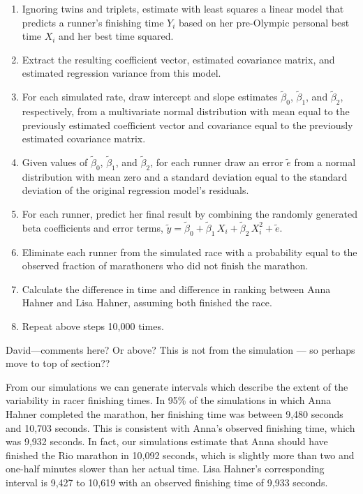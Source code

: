 \documentclass[12pt,titlepage]{article}
\begin{document}
\begin{enumerate}
\item Ignoring twins and triplets, estimate with least squares a
  linear model that predicts a runner's finishing time $Y_i$ based on
  her pre-Olympic personal best time $X_i$ and her best time squared.
\item Extract the resulting coefficient vector, estimated covariance
  matrix, and estimated regression variance from this model.
\item For each simulated rate, draw intercept and slope estimates
  $\tilde{\beta}_0$, $\tilde{\beta}_1$, and $\tilde{\beta}_2$,
  respectively, from a multivariate normal distribution with mean
  equal to the previously estimated coefficient vector and covariance
  equal to the previously estimated covariance matrix.
\item Given values of $\tilde{\beta}_0$, $\tilde{\beta}_1$, and
  $\tilde{\beta}_2$, for each runner draw an error $\tilde{e}$ from a
  normal distribution with mean zero and a standard deviation equal to
  the standard deviation of the original regression model's residuals.
\item For each runner, predict her final result by combining the
  randomly generated beta coefficients and error terms,
  $\tilde{y} = \tilde{\beta}_0 + \tilde{\beta}_1\,X_i +
  \tilde{\beta}_2\,X_i^2 + \tilde{e}$.
\item Eliminate each runner from the simulated race with a probability
  equal to the observed fraction of marathoners who did not finish the
  marathon.
\item Calculate the difference in time and difference in ranking
  between Anna Hahner and Lisa Hahner, assuming both finished the
  race.
\item Repeat above steps 10,000 times.
\end{enumerate}

David---comments here?    Or above?  This is not from the simulation
--- so perhaps move to top of section??




From our simulations we can generate intervals which describe the
extent of the variability in racer finishing times.  In 95\% of the
simulations in which Anna Hahner completed the marathon, her finishing
time was between 9,480 seconds and 10,703 seconds.  This is consistent
with Anna's observed finishing time, which was 9,932 seconds.  In
fact, our simulations estimate that Anna should have finished the Rio
marathon in 10,092 seconds, which is slightly more than two and
one-half minutes slower than her actual time.  Lisa Hahner's
corresponding interval is 9,427 to 10,619 with an observed finishing
time of 9,933 seconds. 
\end{document}
